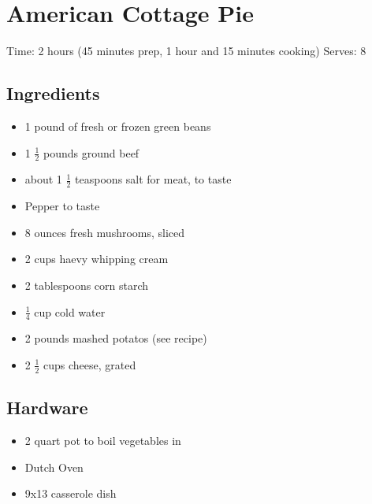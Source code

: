 \section{American Cottage Pie}
\label{americanCottagePie}
\setcounter{secnumdepth}{0}
Time: 2 hours (45 minutes prep, 1 hour and 15 minutes cooking)
Serves: 8

\begin{multicols}{2}
\subsection*{Ingredients}
\begin{itemize}
    \item 1 pound of fresh or frozen green beans
    \item 1 \( \frac{1}{2} \) pounds ground beef
    \item about 1 \( \frac{1}{2} \) teaspoons salt for meat, to taste
    \item Pepper to taste
    \item 8 ounces fresh mushrooms, sliced
    \item 2 cups haevy whipping cream
    \item 2 tablespoons corn starch
    \item \( \frac{1}{4} \) cup cold water
    \item 2 pounds mashed potatos (see  recipe)
    \item 2 \( \frac{1}{2} \) cups cheese, grated
\end{itemize}

\subsection*{Hardware}
\begin{itemize}
    \item 2 quart pot to boil vegetables in
    \item Dutch Oven
    \item 9x13 casserole dish
\end{itemize}
\clearpage


\end{multicols}
